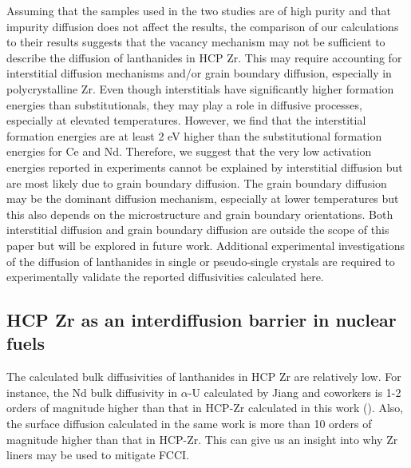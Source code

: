 \documentclass[preprint,12pt]{elsarticle}
\begin{document}
Assuming that the samples used in the two studies \cite{paul_diffusion_1968, helmreich_diffusion_2014} are of high purity and that impurity diffusion does not affect the results, the comparison of our calculations to their results suggests that the vacancy mechanism may not be sufficient to describe the diffusion of lanthanides in HCP Zr. This may require accounting for interstitial diffusion mechanisms and/or grain boundary diffusion, especially in polycrystalline Zr. Even though interstitials have significantly higher formation energies than substitutionals, they may play a role in diffusive processes, especially at elevated temperatures. However, we find that the interstitial formation energies are at least 2 eV higher than the substitutional formation energies for Ce and Nd. Therefore, we suggest that the very low activation energies reported in experiments \cite{paul_diffusion_1968, helmreich_diffusion_2014} cannot be explained by interstitial diffusion but are most likely due to grain boundary diffusion. The grain boundary diffusion may be the dominant diffusion mechanism, especially at lower temperatures but this also depends on the microstructure and grain boundary orientations. Both interstitial diffusion and grain boundary diffusion are outside the scope of this paper but will be explored in future work. Additional experimental investigations of the diffusion of lanthanides in single or pseudo-single crystals are required to experimentally validate the reported diffusivities calculated here.

\subsection{HCP Zr as an interdiffusion barrier in nuclear fuels}

The calculated bulk diffusivities of lanthanides in HCP Zr are relatively low. For instance, the Nd bulk diffusivity in $\alpha$-U calculated by Jiang and coworkers \cite{jiang_bulk_2021} is 1-2 orders of magnitude higher than that in HCP-Zr calculated in this work (). Also, the surface diffusion calculated in the same work is more than 10 orders of magnitude higher than that in HCP-Zr. This can give us an insight into why Zr liners may be used to mitigate FCCI.
\end{document}

